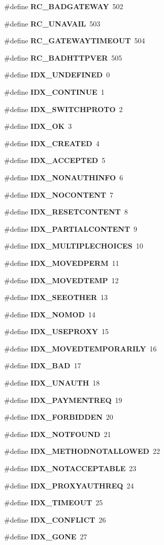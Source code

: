 \begin{CompactItemize}
\item 
\#define {\bf RC\_\-BADGATEWAY}~502
\item 
\#define {\bf RC\_\-UNAVAIL}~503
\item 
\#define {\bf RC\_\-GATEWAYTIMEOUT}~504
\item 
\#define {\bf RC\_\-BADHTTPVER}~505
\item 
\#define {\bf IDX\_\-UNDEFINED}~0
\item 
\#define {\bf IDX\_\-CONTINUE}~1
\item 
\#define {\bf IDX\_\-SWITCHPROTO}~2
\item 
\#define {\bf IDX\_\-OK}~3
\item 
\#define {\bf IDX\_\-CREATED}~4
\item 
\#define {\bf IDX\_\-ACCEPTED}~5
\item 
\#define {\bf IDX\_\-NONAUTHINFO}~6
\item 
\#define {\bf IDX\_\-NOCONTENT}~7
\item 
\#define {\bf IDX\_\-RESETCONTENT}~8
\item 
\#define {\bf IDX\_\-PARTIALCONTENT}~9
\item 
\#define {\bf IDX\_\-MULTIPLECHOICES}~10
\item 
\#define {\bf IDX\_\-MOVEDPERM}~11
\item 
\#define {\bf IDX\_\-MOVEDTEMP}~12
\item 
\#define {\bf IDX\_\-SEEOTHER}~13
\item 
\#define {\bf IDX\_\-NOMOD}~14
\item 
\#define {\bf IDX\_\-USEPROXY}~15
\item 
\#define {\bf IDX\_\-MOVEDTEMPORARILY}~16
\item 
\#define {\bf IDX\_\-BAD}~17
\item 
\#define {\bf IDX\_\-UNAUTH}~18
\item 
\#define {\bf IDX\_\-PAYMENTREQ}~19
\item 
\#define {\bf IDX\_\-FORBIDDEN}~20
\item 
\#define {\bf IDX\_\-NOTFOUND}~21
\item 
\#define {\bf IDX\_\-METHODNOTALLOWED}~22
\item 
\#define {\bf IDX\_\-NOTACCEPTABLE}~23
\item 
\#define {\bf IDX\_\-PROXYAUTHREQ}~24
\item 
\#define {\bf IDX\_\-TIMEOUT}~25
\item 
\#define {\bf IDX\_\-CONFLICT}~26
\item 
\#define {\bf IDX\_\-GONE}~27

\end{CompactItemize}
